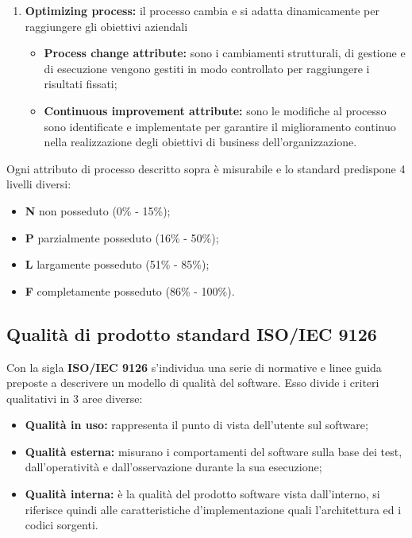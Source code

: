 \begin{enumerate}[label*=\arabic*]
\item \textbf{Optimizing process:} il processo cambia e si adatta dinamicamente per raggiungere gli obiettivi aziendali
		\begin{itemize}
			\item \textbf{Process change attribute:} sono i cambiamenti strutturali, di gestione e di esecuzione vengono gestiti in modo controllato per raggiungere i risultati fissati;
			\item \textbf{Continuous improvement attribute:} sono le modifiche al processo sono identificate e implementate per garantire il miglioramento continuo nella realizzazione degli obiettivi di \gls{business} dell'organizzazione.
		\end{itemize}

\end{enumerate}

\noindent Ogni attributo di processo descritto sopra è misurabile e lo standard predispone 4 livelli diversi:
\begin{itemize}[label={}]
	\item \textbf{N} non posseduto (0\% - 15\%);
	\item \textbf{P} parzialmente posseduto (16\% - 50\%);
	\item \textbf{L} largamente posseduto (51\% - 85\%);
	\item \textbf{F} completamente posseduto (86\% - 100\%).
\end{itemize}

\subsection{Qualità di prodotto standard ISO/IEC 9126} \label{9126}
Con la sigla \textbf{ISO/IEC 9126} s'individua una serie di normative e linee guida preposte a descrivere un modello di qualità del software.
Esso divide i criteri qualitativi in 3 aree diverse:
\begin{itemize}

	\item \textbf{Qualità in uso:} rappresenta il punto di vista dell'utente sul software;
	\item \textbf{Qualità esterna:} misurano i comportamenti del software sulla base dei test, dall'operatività e dall'osservazione durante la sua esecuzione;
	\item \textbf{Qualità interna:} è la qualità del prodotto software vista dall'interno, si riferisce quindi alle caratteristiche d'implementazione quali l'architettura ed i codici sorgenti.
\end{itemize}

